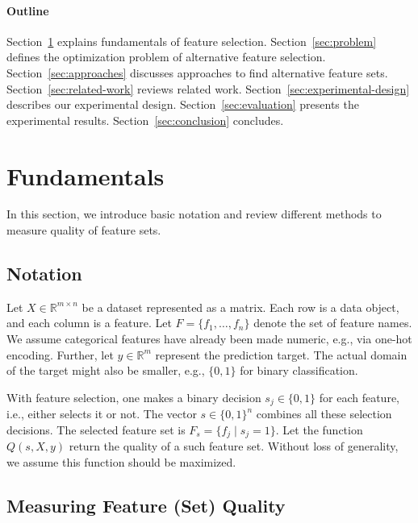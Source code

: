 \documentclass{article}
\theoremstyle{definition}
\begin{document}
\paragraph{Outline}

Section~\ref{sec:fundamentals} explains fundamentals of feature selection.
Section~\ref{sec:problem} defines the optimization problem of alternative feature selection.
Section~\ref{sec:approaches} discusses approaches to find alternative feature sets.
Section~\ref{sec:related-work} reviews related work.
Section~\ref{sec:experimental-design} describes our experimental design.
Section~\ref{sec:evaluation} presents the experimental results.
Section~\ref{sec:conclusion} concludes.

\section{Fundamentals}
\label{sec:fundamentals}

In this section, we introduce basic notation and review different methods to measure quality of feature sets.

\subsection{Notation}
\label{sec:fundamentals:notation}

Let $X \in \mathbb{R}^{m \times n}$ be a dataset represented as a matrix.
Each row is a data object, and each column is a feature.
Let $F = \{f_1, \dots, f_n\}$ denote the set of feature names.
We assume categorical features have already been made numeric, e.g., via one-hot encoding.
Further, let $y \in \mathbb{R}^m$ represent the prediction target.
The actual domain of the target might also be smaller, e.g., $\{0,1\}$ for binary classification.

With feature selection, one makes a binary decision $s_j \in \{0,1\}$ for each feature, i.e., either selects it or not.
The vector $s \in \{0,1\}^n$ combines all these selection decisions.
The selected feature set is $F_s = \{f_j \mid s_j=1\}$.
Let the function $Q(s,X,y)$ return the quality of a such feature set.
Without loss of generality, we assume this function should be maximized.

\subsection{Measuring Feature (Set) Quality}
\label{sec:fundamentals:quality}
\end{document}
